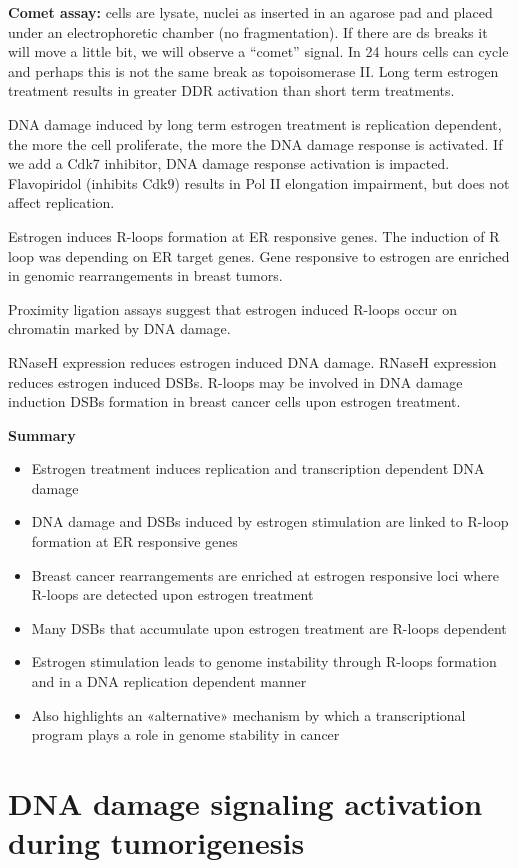 \textbf{Comet assay:} cells are lysate, nuclei as inserted in an agarose pad and placed under an electrophoretic chamber (no fragmentation). If there are ds breaks it will move a little bit, we will observe a ``comet'' signal. In 24 hours cells can cycle and perhaps this is not the same break as topoisomerase II. Long term estrogen treatment results in greater DDR activation than short term treatments.

DNA damage induced by long term estrogen treatment is replication dependent, the more the cell proliferate, the more the DNA damage response is activated. If we add a Cdk7 inhibitor, DNA damage response activation is impacted. Flavopiridol (inhibits Cdk9) results in Pol II elongation impairment, but does not affect replication.

Estrogen induces R-loops formation at ER responsive genes. The induction of R loop was depending on ER target genes. Gene responsive to estrogen are enriched in genomic rearrangements in breast tumors. 

Proximity ligation assays suggest that estrogen induced R-loops occur on chromatin marked by DNA damage.

RNaseH expression reduces estrogen induced DNA damage. RNaseH expression reduces estrogen induced DSBs. R-loops may be involved in DNA damage induction DSBs formation in breast cancer cells upon estrogen treatment.

\textbf{Summary}
\begin{itemize}
\tightlist
\item
  Estrogen treatment induces replication and transcription dependent DNA damage
\item
  DNA damage and DSBs induced by estrogen stimulation are linked to R-loop formation at ER responsive genes
\item
  Breast cancer rearrangements are enriched at estrogen responsive loci where R-loops are detected upon estrogen treatment
\item
  Many DSBs that accumulate upon estrogen treatment are R-loops dependent
\item
  Estrogen stimulation leads to genome instability through R-loops formation and in a DNA
  replication dependent manner
\item
  Also highlights an «alternative» mechanism by which a transcriptional program plays a role in genome stability in cancer
\end{itemize}

\hypertarget{dna-damage-signaling-activation-during-tumorigenesis}{%
\section{DNA damage signaling activation during
tumorigenesis}\label{dna-damage-signaling-activation-during-tumorigenesis}}

